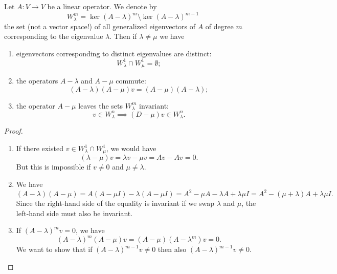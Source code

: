 \begin{proposition}
Let $A\colon V \to V$ be a linear operator.
We denote by
\[
  W_\lambda^m = \ker (A-\lambda)^m \setminus \ker (A-\lambda)^{m-1}
\]
the set (not a vector space!) of all generalized eigenvectors
of $A$ of degree $m$ corresponding to the eigenvalue $\lambda$.
Then if $\lambda \neq \mu$ we have
\begin{enumerate}
\item eigenvectors corresponding to distinct eigenvalues are distinct:
\[
W_\lambda^1 \cap W_\mu^1 = \emptyset;
\]
\item the operators $A-\lambda$ and $A-\mu$ commute:
\[
  (A-\lambda)(A-\mu)v = (A-\mu)(A-\lambda);
\]
\item
the operator $A-\mu$ leaves the sets $W_\lambda^m$ invariant:
\[
  v\in W_\lambda^n
  \implies
  (D-\mu)v \in W_\lambda^n.
\]
\end{enumerate}
\end{proposition}
%
\begin{proof}
\begin{enumerate}
\item
If there existed $v\in W_\lambda^1 \cap W_\mu^1$, we would have
\[
(\lambda - \mu) v = \lambda v - \mu v = Av - Av = 0.
\]
But this is impossible if $v\neq 0$ and $\mu\neq \lambda$.

\item
We have
\[
  (A-\lambda)(A-\mu)
  = A(A-\mu I) - \lambda (A-\mu I)
  = A^2 - \mu A -\lambda A + \lambda \mu I
  = A^2 - (\mu+\lambda) A + \lambda\mu I.
\]
Since the right-hand side of the equality is invariant if
we swap $\lambda$ and $\mu$, the left-hand side must also be invariant.

\item
If $(A-\lambda)^m v = 0$, we have
\[
(A-\lambda)^m (A-\mu) v = (A-\mu)(A-\lambda^m) v = 0.
\]
We want to show that if $(A-\lambda)^{m-1} v \neq 0$
then also $(A-\lambda)^{m-1} v \neq 0$.

\end{enumerate}
\end{proof}